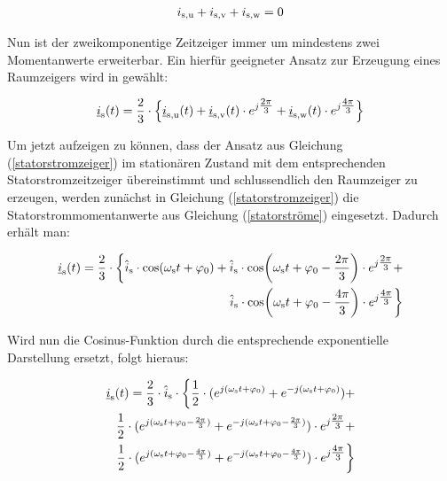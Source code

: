 \begin{align}
	i_\i{s,u} + i_\i{s,v} + i_\i{s,w} = 0 
	\label{knotengleichung}
\end{align}


Nun ist der zweikomponentige Zeitzeiger immer um mindestens zwei Momentanwerte erweiterbar. 
Ein hierfür geeigneter Ansatz zur Erzeugung eines Raumzeigers wird in \parencite{nuss2010} gewählt:

\begin{align}
	\underline{i}_{\mathrm{s}}(t) = \frac{2}{3} \cdot \Bigl\{\underline{i}_{\mathrm{s,u}}(t) + \underline{i}_{\mathrm{s,v}}(t)\cdot e^{j\tfrac{2\pi}{3}} + \underline{i}_{\mathrm{s,w}}(t)\cdot e^{j\tfrac{4\pi}{3}} \Bigr\} \label{statorstromzeiger}
\end{align}

Um jetzt aufzeigen zu können, dass der Ansatz aus Gleichung (\ref{statorstromzeiger}) im stationären Zustand mit dem entsprechenden Statorstromzeitzeiger übereinstimmt und schlussendlich den Raumzeiger zu erzeugen, werden zunächst in Gleichung (\ref{statorstromzeiger}) die Statorstrommomentanwerte aus Gleichung (\ref{statorströme}) eingesetzt.
Dadurch erhält man:

\begin{align}
	\begin{split}
\underline{i}_\i{s}(t) = \frac{2}{3} \cdot \biggl\{\hat{i}_\i{s}\cdot\si{cos}(\omega_\i{s}t+\varphi_{0}) + \hat{i}_\i{s}\cdot\si{cos}\bigg(\omega_\i{s}t+\varphi_{0}-\frac{2\pi}{3}\bigg)\cdot e^{j\tfrac{2\pi}{3}} + \\ \hat{i}_\i{s}\cdot\si{cos}\bigg(\omega_\i{s}t+\varphi_\i{0}-\frac{4\pi}{3}\bigg)\cdot e^{j\tfrac{4\pi}{3}} \biggr\}
\label{zwischen1}
\end{split}
\end{align}

Wird nun die Cosinus-Funktion durch die entsprechende exponentielle Darstellung ersetzt, folgt hieraus:

\begin{align}
	\begin{split}
	\underline{i}_\i{s}(t) = \frac{2}{3} \cdot \hat{i}_\i{s} \cdot \biggl\{ \frac{1}{2} \cdot ( e^{j(\omega_\i{s}t+\varphi_\i{0})} + e^{-j(\omega_\i{s}t+\varphi_\i{0})} ) + \\ \frac{1}{2} \cdot ( e^{j(\omega_\i{s}t+\varphi_\i{0}-\frac{2\pi}{3})} + e^{-j(\omega_\i{s}t+\varphi_\i{0}-\frac{2\pi}{3})})\cdot e^{j\tfrac{2\pi}{3}} + \\ \frac{1}{2} \cdot ( e^{j(\omega_\i{s}t+\varphi_\i{0}-\frac{4\pi}{3})} + e^{-j(\omega_\i{s}t+\varphi_\i{0}-\frac{4\pi}{3})})\cdot e^{j\tfrac{4\pi}{3}}  \biggr\}
	\label{zwischen2}
	\end{split}
\end{align}

